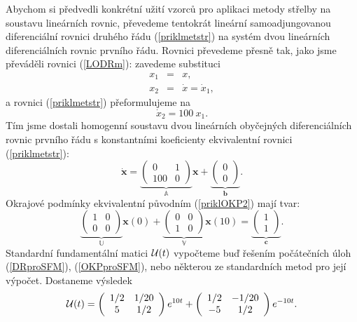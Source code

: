 \documentclass[a4paper, 12pt]{book}
\theoremstyle{definition}
\def\vc#1{\mathbf{\boldsymbol{#1}}}     %
\def\tn#1{{\mathbb{#1}}}    %
\begin{document}
Abychom si předvedli konkrétní užití vzorců pro aplikaci metody střelby na soustavu
lineárních rovnic, převedeme tentokrát lineární samoadjungovanou diferenciální rovnici 
druhého řádu (\ref{priklmetstr}) na systém dvou lineárních diferenciálních rovnic 
prvního řádu. Rovnici převedeme přesně tak, jako jsme převáděli rovnici (\ref{LODRm}):
zavedeme substituci
\begin{eqnarray*}
x_1 &=& x,\\
x_2 &=& \dot x = \dot x_1,
\end{eqnarray*}
a rovnici (\ref{priklmetstr}) přeformulujeme na 
\begin{displaymath}
\dot x_2= 100~x_1.
\end{displaymath}
Tím jsme dostali homogenní soustavu dvou lineárních obyčejných diferenciálních 
rovnic prvního řádu s konstantními koeficienty ekvivalentní rovnici (\ref{priklmetstr}):
\begin{equation}\label{exampleS}
\dot{\vc x}= \underbrace{\left(\begin{array}{cc}0 & 1 \\ 100 & 0\end{array}\right)}_{\tn A}\vc x+
\underbrace{\left(\begin{array}{c}0 \\ 0\end{array}\right)}_{\vc b}.
\end{equation}
Okrajové podmínky ekvivalentní původním (\ref{priklOKP2}) mají tvar:
\begin{equation}\label{priklSOKP}
\underbrace{\left(\begin{array}{cc}1 & 0 \\ 0 & 0\end{array}\right)}_{\tn U}\vc x(0)+
\underbrace{\left(\begin{array}{cc}0 & 0 \\ 1 & 0\end{array}\right)}_{\tn V}\vc x(10)=
\underbrace{\left(\begin{array}{c}1 \\ 1\end{array}\right)}_{\vc c}.
\end{equation}
Standardní fundamentální matici ${\cal U}(t)$ vypočteme buď řešením počátečních úloh
(\ref{DRproSFM}), (\ref{OKPproSFM}), nebo některou ze standardních metod pro její
výpočet. Dostaneme výsledek
\begin{displaymath}
{\cal U}(t)=\left(\begin{array}{cc}1/2 & 1/20 \\ 5 & 1/2\end{array}\right)e^{10t}+
\left(\begin{array}{cc}1/2 & -1/20\\ -5& 1/2\end{array}\right)e^{-10t}.
\end{displaymath}
\end{document}

